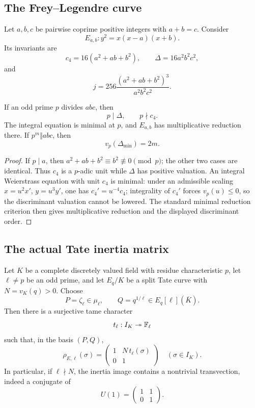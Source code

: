 
\subsection{The Frey--Legendre curve}

Let $a,b,c$ be pairwise coprime positive integers with $a+b=c$.  Consider
\[
 E_{a,b}:y^2=x(x-a)(x+b).
\]
Its invariants are
\[
 c_4=16(a^2+ab+b^2),\qquad
 \Delta=16a^2b^2c^2,
\]
and
\[
 j=256\frac{(a^2+ab+b^2)^3}{a^2b^2c^2}.
\]

\begin{lemma}\label{lem:odd-mult}
If an odd prime $p$ divides $abc$, then
\[
 p\mid\Delta,\qquad p\nmid c_4.
\]
The integral equation is minimal at $p$, and $E_{a,b}$ has multiplicative reduction there.  If $p^m\Vert abc$, then
\[
 v_p(\Delta_{\min})=2m.
\]
\end{lemma}

\begin{proof}
If $p\mid a$, then $a^2+ab+b^2\equiv b^2\not\equiv0\pmod p$; the other two cases are identical.  Thus $c_4$ is a $p$-adic unit while $\Delta$ has positive valuation.  An integral Weierstrass equation with unit $c_4$ is minimal: under an admissible scaling $x=u^2x'$, $y=u^3y'$, one has $c_4'=u^{-4}c_4$; integrality of $c_4'$ forces $v_p(u)\le0$, so the discriminant valuation cannot be lowered.  The standard minimal reduction criterion then gives multiplicative reduction and the displayed discriminant order.
\end{proof}

\subsection{The actual Tate inertia matrix}

\begin{theorem}\label{thm:tate-inertia}
Let $K$ be a complete discretely valued field with residue characteristic $p$, let $\ell\ne p$ be an odd prime, and let $E_q/K$ be a split Tate curve with $N=v_K(q)>0$.  Choose
\[
 P=\zeta_\ell\in\mu_\ell,\qquad Q=q^{1/\ell}\in E_q[\ell](\overline K).
\]
Then there is a surjective tame character
\[
 t_\ell:I_K\twoheadrightarrow\mathbb F_\ell
\]
such that, in the basis $(P,Q)$,
\[
 \rho_{E,\ell}(\sigma)=
 \begin{pmatrix}
 1&N\,t_\ell(\sigma)\\
 0&1
 \end{pmatrix}
 \quad(\sigma\in I_K).
\]
In particular, if $\ell\nmid N$, the inertia image contains a nontrivial transvection, indeed a conjugate of
\[
 U(1)=\begin{pmatrix}1&1\\0&1\end{pmatrix}.
\]
\end{theorem}

